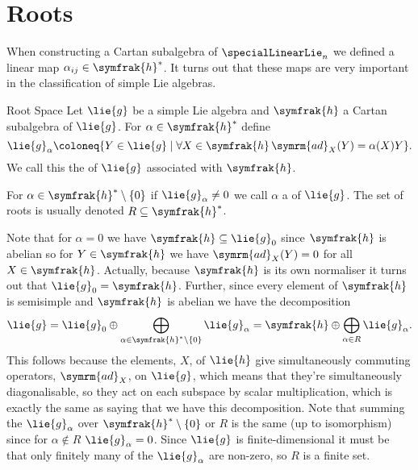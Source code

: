 \documentclass[fleqn]{NotesClass}
\newcommand{\ad}{\symrm{ad}}
\newcommand{\csa}{\symfrak{h}}
\begin{document}
    \section{Roots}
    When constructing a Cartan subalgebra of \(\specialLinearLie_n\) we defined a linear map \(\alpha_{ij} \in \csa^*\).
    It turns out that these maps are very important in the classification of simple Lie algebras.
    
    \begin{dfn}{Root Space}{}
        Let \(\lie{g}\) be a simple Lie algebra and \(\csa\) a Cartan subalgebra of \(\lie{g}\).
        For \(\alpha \in \csa^*\) define
        \begin{equation}
            \lie{g}_\alpha \coloneq \{Y \in \lie{g} \mid \forall X \in \csa \, \ad_X(Y) = \alpha(X)Y\}.
        \end{equation}
        We call this the  of \(\lie{g}\) associated with \(\csa\).
        
        For \(\alpha \in \csa^*\setminus\{0\}\) if \(\lie{g}_{\alpha} \ne 0\) we call \(\alpha\) a  of \(\lie{g}\).
        The set of roots is usually denoted \(R \subseteq \csa^*\).
    \end{dfn}
    
    Note that for \(\alpha = 0\) we have \(\csa \subseteq \lie{g}_0\) since \(\csa\) is abelian so for \(Y \in \csa\) we have \(\ad_X(Y) = 0\) for all \(X \in \csa\).
    Actually, because \(\csa\) is its own normaliser it turns out that \(\lie{g}_0 = \csa\).
    Further, since every element of \(\csa\) is semisimple and \(\csa\) is abelian we have the decomposition
    \begin{equation}
        \lie{g} = \lie{g}_0 \oplus \bigoplus_{\alpha \in \csa^*\setminus\{0\}} \lie{g}_{\alpha} = \csa \oplus \bigoplus_{\alpha \in R} \lie{g}_\alpha.
    \end{equation}
    This follows because the elements, \(X\), of \(\lie{h}\) give simultaneously commuting operators, \(\ad_X\), on \(\lie{g}\), which means that they're simultaneously diagonalisable, so they act on each subspace by scalar multiplication, which is exactly the same as saying that we have this decomposition.
    Note that summing the \(\lie{g}_\alpha\) over \(\csa^*\setminus\{0\}\) or \(R\) is the same (up to isomorphism) since for \(\alpha \notin R\) \(\lie{g}_\alpha = 0\).
    Since \(\lie{g}\) is finite-dimensional it must be that only finitely many of the \(\lie{g}_\alpha\) are non-zero, so \(R\) is a finite set.
    
\end{document}
